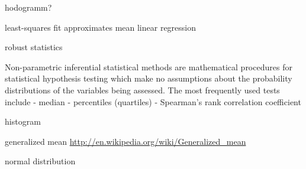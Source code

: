 hodogramm?



least-squares fit approximates mean
linear regression

robust statistics

Non-parametric inferential statistical methods are mathematical procedures for statistical hypothesis testing which make no assumptions about the probability distributions of the variables being assessed. The most frequently used tests include
- median
- percentiles (quartiles)
- Spearman's rank correlation coefficient

histogram

generalized mean
\url{http://en.wikipedia.org/wiki/Generalized_mean}



normal distribution

% 
% 


